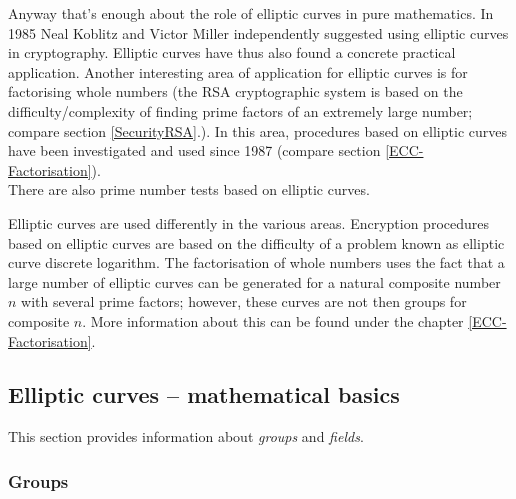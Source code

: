 Anyway that's enough about the role of elliptic curves in pure mathematics. 
In 1985 Neal Koblitz and Victor Miller
independently suggested using elliptic curves in cryptography. Elliptic 
curves have thus also found a concrete practical application. 
Another interesting area of application for elliptic curves is for
factorising whole numbers  (the RSA cryptographic system
is based on the  difficulty/complexity of finding prime
factors of an extremely large number;  compare section \ref{SecurityRSA}.).
In this area, procedures based on elliptic curves have been investigated and
used since 1987 (compare section \ref{ECC-Factorisation}). \\
There are also prime number tests based on elliptic
curves.

Elliptic curves are used differently in the various areas. Encryption
procedures based on elliptic curves are based on the difficulty of a problem
known as elliptic curve discrete logarithm.
The factorisation of whole numbers uses the fact that a large number of
elliptic curves can be generated for a natural composite number $n$ with
several prime factors; however, these curves are not then groups for composite
$n$. More information about this can be found under the chapter \ref{ECC-Factorisation}.

\subsection{Elliptic curves -- mathematical basics}

This section provides information about  {\em groups} and
 {\em fields}.

\subsubsection{Groups}

